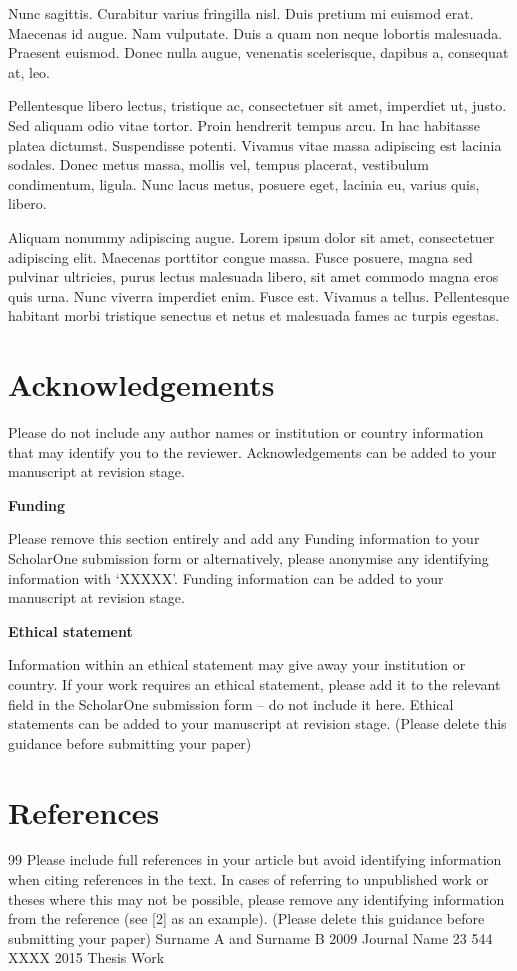 \documentclass{article}
\begin{document}
Nunc sagittis. Curabitur varius fringilla nisl. Duis pretium mi euismod erat. Maecenas id augue. Nam vulputate. Duis a quam non neque lobortis malesuada. Praesent euismod. Donec nulla augue, venenatis scelerisque, dapibus a, consequat at, leo.

Pellentesque libero lectus, tristique ac, consectetuer sit amet, imperdiet ut, justo. Sed aliquam odio vitae tortor. Proin hendrerit tempus arcu. In hac habitasse platea dictumst. Suspendisse potenti. Vivamus vitae massa adipiscing est lacinia sodales. Donec metus massa, mollis vel, tempus placerat, vestibulum condimentum, ligula. Nunc lacus metus, posuere eget, lacinia eu, varius quis, libero.

Aliquam nonummy adipiscing augue. Lorem ipsum dolor sit amet, consectetuer adipiscing elit. Maecenas porttitor congue massa. Fusce posuere, magna sed pulvinar ultricies, purus lectus malesuada libero, sit amet commodo magna eros quis urna. Nunc viverra imperdiet enim. Fusce est. Vivamus a tellus. Pellentesque habitant morbi tristique senectus et netus et malesuada fames ac turpis egestas.

\section{Acknowledgements}

Please do not include any author names or institution or country information that may identify you to the reviewer. Acknowledgements can be added to your manuscript at revision stage.

\textbf{Funding}

Please remove this section entirely and add any Funding information to your ScholarOne submission form or alternatively, please anonymise any identifying information with ‘XXXXX’. Funding information can be added to your manuscript at revision stage. 

\textbf{Ethical statement}

Information within an ethical statement may give away your institution or country. If your work requires an ethical statement, please add it to the relevant field in the ScholarOne submission form – do not include it here. Ethical statements can be added to your manuscript at revision stage. (Please delete this guidance before submitting your paper)

\section{References}


\begin{thebibliography}{99}
\bibitem{} Please include full references in your article but avoid identifying information when citing references in the text.
\bibitem{} In cases of referring to unpublished work or theses where this may not be possible, please remove any identifying information from the reference (see [2] as an example).
\bibitem{} (Please delete this guidance before submitting your paper)
\bibitem{} Surname A and Surname B 2009 Journal Name 23 544
\bibitem{} XXXX 2015 Thesis Work
\end{thebibliography}
\end{document}
